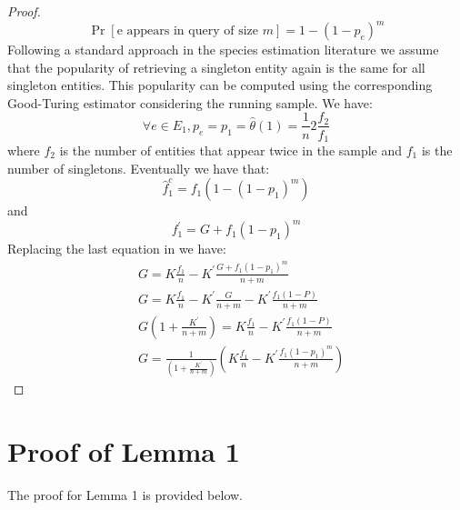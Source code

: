 \documentclass[conference]{IEEEtran}
\begin{document}
\begin{proof}
\begin{equation}
\Pr[\mbox{e appears in query of size $m$}] = 1 - (1-p_e)^m
\end{equation}
Following a standard approach in the species estimation literature we assume that the popularity of retrieving a singleton entity again is the same for all singleton entities. This popularity can be computed using the corresponding Good-Turing estimator considering the running sample. We have:
\begin{equation}
\forall e \in E_1, p_e = p_1 = \hat{\theta}(1) = \frac{1}{n}2\frac{f_2}{f_1}
\end{equation}
where $f_2$ is the number of entities that appear twice in the sample and $f_1$ is the number of singletons. 
Eventually we have that:
\begin{equation}
\hat{f}_1^c = f_1(1 - (1-p_1)^m)
\end{equation}
and
\begin{equation}
f^{\prime}_1 = G + f_1(1-p_1)^m
\end{equation}
Replacing the last equation in  we have:
\begin{align}
&G = K\frac{f_1}{n} - K^{\prime}\frac{G + f_1(1-p_1)^m}{n+m} \nonumber \\
&G = K\frac{f_1}{n} - K^{\prime}\frac{G}{n+m} - K^{\prime}\frac{f_1(1- P)}{n+m} \nonumber \\
&G(1 + \frac{K^{\prime}}{n+m}) = K\frac{f_1}{n} - K^{\prime}\frac{f_1(1- P)}{n+m} \nonumber \\
&G = \frac{1}{(1 + \frac{K^{\prime}}{n+m})}(K\frac{f_1}{n} - K^{\prime}\frac{f_1(1-p_1)^m}{n+m}) \nonumber
\end{align}
\end{proof}

\section{Proof of Lemma 1}
\label{sec:prle1}

The proof for Lemma 1 is provided below.
\end{document}
